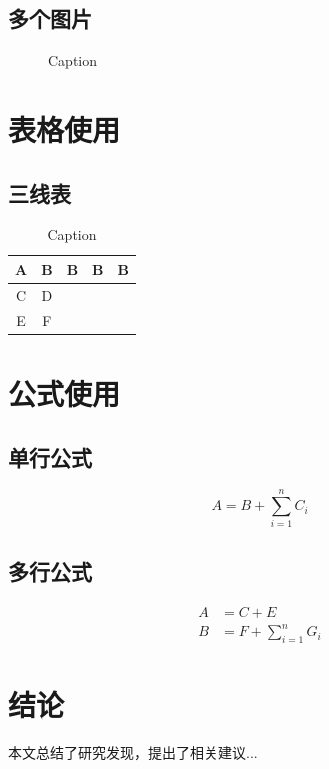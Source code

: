 \section{多个图片}
\begin{figure}[h]
    \centering
    \caption{Caption}
    \label{fig:enter-label2}
\end{figure}

\chapter{表格使用}
\thispagestyle{fancy}  %
\section{三线表}
\begin{table}[h]
    \centering
    \begin{tabular}{c|c|c|c|c}
        \toprule
        A & B & B & B & B\\
        \midrule
        C & D & & & \\
        \midrule
        E & F & & & \\
        \bottomrule
    \end{tabular}
    \caption{Caption}
    \label{tab:my_label}
\end{table}

\chapter{公式使用}
\section{单行公式}
\begin{equation}\label{eqn:5-1}
    A = B + \sum_{i=1}^{n}C_{i}
\end{equation}
\section{多行公式}
\begin{subequations}
\begin{align}
    A &= C + E \label{eqn:5-2a}\\
      B  &= F + \sum_{i=1}^{n} G_{i}\label{eqn:5-2b}
\end{align}
\end{subequations}
    
\chapter{结论}
\thispagestyle{fancy}
本文总结了研究发现，提出了相关建议...
